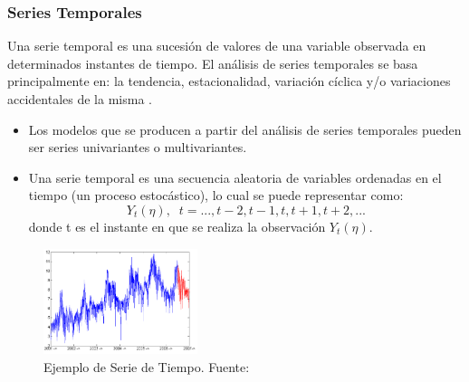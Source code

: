 \documentclass{beamer}
\begin{document}
\begin{frame}
   \frametitle{Series Temporales}
   \scriptsize
   Una serie temporal es una sucesión de valores de una variable observada en determinados instantes de tiempo. El análisis de series temporales se basa
   principalmente en: la tendencia, estacionalidad, variación cíclica y/o variaciones accidentales de la misma \cite{ser_temp_1,ser_tmp_2}.
   \vspace{0.1cm}
   \begin{itemize}
      \item Los modelos que se producen a partir del análisis de series temporales pueden ser series univariantes o multivariantes.
      \item Una serie temporal es una secuencia aleatoria de variables ordenadas en el tiempo (un proceso estocástico), lo cual se puede representar como:
            \begin{equation}
              \label{serie_temporal}
              Y_t(\eta), \;\; t = \mbox{...}, t-2, t-1, t, t + 1, t + 2, \mbox{...}
            \end{equation}
            donde t es el instante en que se realiza la observación $Y_t(\eta)$.
   \end{itemize}
   \begin{figure}[h!]
      \centering \includegraphics[heigth=4.1cm,width=4.5cm]{serie_de_tiempo}
      \caption{\tiny Ejemplo de Serie de Tiempo. Fuente: }
   \end{figure}
\end{frame}
\end{document}
